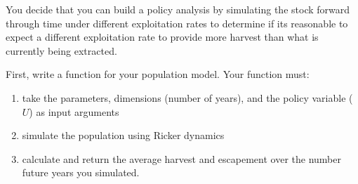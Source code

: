\documentclass[]{book}
\providecommand{\tightlist}{%
  \setlength{\itemsep}{0pt}\setlength{\parskip}{0pt}}
\theoremstyle{definition}
\theoremstyle{definition}
\theoremstyle{definition}
\theoremstyle{remark}
\begin{document}
You decide that you can build a policy analysis by simulating the stock
forward through time under different exploitation rates to determine if
its reasonable to expect a different exploitation rate to provide more
harvest than what is currently being extracted.

First, write a function for your population model. Your function must:

\begin{enumerate}
\def\labelenumi{\arabic{enumi}.}
\tightlist
\item
  take the parameters, dimensions (number of years), and the policy
  variable (\(U\)) as input arguments
\item
  simulate the population using Ricker dynamics
\item
  calculate and return the average harvest and escapement over the
  number future years you simulated.
\end{enumerate}
\end{document}
